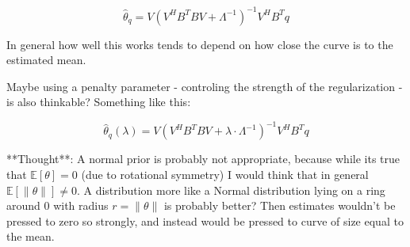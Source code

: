 $$ \hat\theta_q = V ( V^H B^T B V + \Lambda^{-1})^{-1} V^H B^T q$$

In general how well this works tends to depend on how close the curve is to the estimated mean.

Maybe using a penalty parameter - controling the strength of the regularization - is also thinkable? Something like this:

$$ \hat\theta_q(\lambda) = V ( V^H B^T B V + \lambda \cdot \Lambda^{-1})^{-1} V^H B^T q$$

**Thought**: A normal prior is probably not appropriate, because while its true that $\mathbb{E}[\theta] = 0$ (due to rotational symmetry) I would think that in general $\mathbb{E}[\lVert\theta\rVert] \neq 0$. A distribution more like a Normal distribution lying on a ring around 0 with radius $r = \lVert\theta\rVert$ is probably better? Then estimates wouldn't be pressed to zero so strongly, and instead would be pressed to curve of size equal to the mean.
